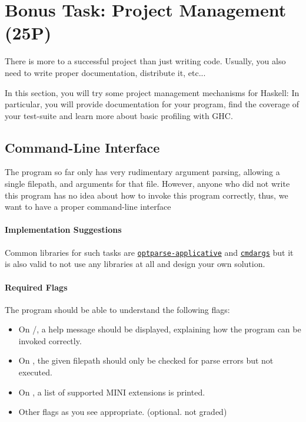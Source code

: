 \documentclass{article}
\begin{document}
\section{Bonus Task: Project Management (25P)}

There is more to a successful project than just writing code. Usually, you also need to write proper documentation, distribute it, etc...

In this section, you will try some project management mechanisms for Haskell: In particular, you will provide documentation for your program, find the coverage of your test-suite and learn more about basic profiling with GHC.

\subsection{Command-Line Interface}

The program so far only has very rudimentary argument parsing, allowing a single filepath, and arguments for that file.
However, anyone who did not write this program has no idea about how to invoke this program correctly, thus, we want to have a proper command-line interface

\paragraph{Implementation Suggestions}

Common libraries for such tasks are \href{https://hackage.haskell.org/package/optparse-applicative}{\texttt{optparse-applicative}} and \href{https://hackage.haskell.org/package/cmdargs}{\texttt{cmdargs}} but it is also valid to not use any libraries at all and design your own solution.

\paragraph{Required Flags}

The program should be able to understand the following flags:

\begin{itemize}
\item On /, a help message should be displayed, explaining how the program can be invoked correctly.
\item On , the given filepath should only be checked for parse errors but not executed.
\item On , a list of supported MINI extensions is printed.
\item Other flags as you see appropriate. (optional. not graded)
\end{itemize}
\end{document}
